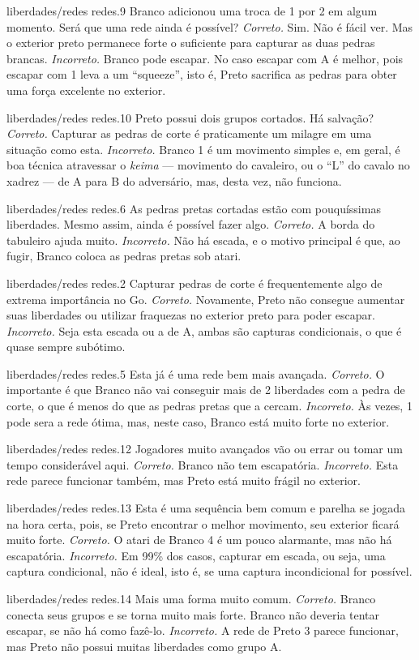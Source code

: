 \problemAnswerDiagram
  {liberdades/redes}
  {redes.9}
  {Branco adicionou uma troca de 1 por 2 em algum momento. Será que uma rede ainda é possível?}
  {\emph{Correto.} Sim. Não é fácil ver. Mas o exterior preto permanece forte o suficiente para capturar as duas pedras brancas.}
  {\emph{Incorreto.} Branco pode escapar. No caso escapar com A é melhor, pois escapar com 1 leva a um ``squeeze'', isto é, Preto sacrifica as pedras para obter uma força excelente no exterior.}
  
\problemAnswerDiagram
  {liberdades/redes}
  {redes.10}
  {Preto possui dois grupos cortados. Há salvação?}
  {\emph{Correto.} Capturar as pedras de corte é praticamente um milagre em uma situação como esta.}
  {\emph{Incorreto.} Branco 1 é um movimento simples e, em geral, é boa técnica atravessar o \emph{keima} --- movimento do cavaleiro, ou o ``L'' do cavalo no xadrez --- de A para B do adversário, mas, desta vez, não funciona.}

\problemAnswerDiagram
  {liberdades/redes}
  {redes.6}
  {As pedras pretas cortadas estão com pouquíssimas liberdades. Mesmo assim, ainda é possível fazer algo.}
  {\emph{Correto.} A borda do tabuleiro ajuda muito.}
  {\emph{Incorreto.} Não há escada, e o motivo principal é que, ao fugir, Branco coloca as pedras pretas sob atari.}

\problemAnswerDiagram
  {liberdades/redes}
  {redes.2}
  {Capturar pedras de corte é frequentemente algo de extrema importância no Go.}
  {\emph{Correto.} Novamente, Preto não consegue aumentar suas liberdades ou utilizar fraquezas no exterior preto para poder escapar.}
  {\emph{Incorreto.} Seja esta escada ou a de A, ambas são capturas condicionais, o que é quase sempre subótimo.}

\problemAnswerDiagram
  {liberdades/redes}
  {redes.5}
  {Esta já é uma rede bem mais avançada.}
  {\emph{Correto.} O importante é que Branco não vai conseguir mais de 2 liberdades com a pedra de corte, o que é menos do que as pedras pretas que a cercam.}
  {\emph{Incorreto.} Às vezes, 1 pode sera a rede ótima, mas, neste caso, Branco está muito forte no exterior.}

\problemAnswerDiagram
  {liberdades/redes}
  {redes.12}
  {Jogadores muito avançados vão ou errar ou tomar um tempo considerável aqui.}
  {\emph{Correto.} Branco não tem escapatória.}
  {\emph{Incorreto.} Esta rede parece funcionar também, mas Preto está muito frágil no exterior.}

\problemAnswerDiagram
  {liberdades/redes}
  {redes.13}
  {Esta é uma sequência bem comum e parelha se jogada na hora certa, pois, se Preto encontrar o melhor movimento, seu exterior ficará muito forte.}
  {\emph{Correto.} O atari de Branco 4 é um pouco alarmante, mas não há escapatória.}
  {\emph{Incorreto.} Em 99\% dos casos, capturar em escada, ou seja, uma captura condicional, não é ideal, isto é, se uma captura incondicional for possível.}

\problemAnswerDiagram
  {liberdades/redes}
  {redes.14}
  {Mais uma forma muito comum.}
  {\emph{Correto.} Branco conecta seus grupos e se torna muito mais forte. Branco não deveria tentar escapar, se não há como fazê-lo.}
  {\emph{Incorreto.} A rede de Preto 3 parece funcionar, mas Preto não possui muitas liberdades como grupo A.}